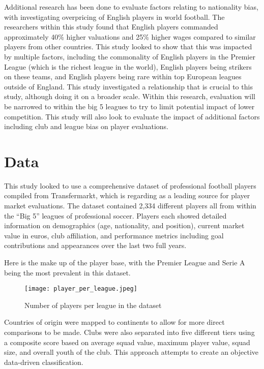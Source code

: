 \documentclass[12pt,a4paper]{article}
\begin{document}
Additional research has been done to evaluate factors relating to nationality bias, with \cite{Bell2023} investigating overpricing of English players in world football. The researchers within this study found that English players commanded approximately 40\% higher valuations and 25\% higher wages compared to similar players from other countries. This study looked to show that this was impacted by multiple factors, including the commonality of English players in the Premier League (which is the richest league in the world), English players being strikers on these teams, and English players being rare within top European leagues outside of England. This study investigated a relationship that is crucial to this study, although doing it on a broader scale. Within this research, evaluation will be narrowed to within the big 5 leagues to try to limit potential impact of lower competition. This study will also look to evaluate the impact of additional factors including club and league bias on player evaluations. 

\section{Data}
\label{sec:Data}
This study looked to use a comprehensive dataset of professional football players compiled from Transfermarkt, which is regarding as a leading source for player market evaluations. The dataset contained 2,334 different players all from within the “Big 5” leagues of professional soccer. Players each showed detailed information on demographics (age, nationality, and position), current market value in euros, club affiliation, and performance metrics including goal contributions and appearances over the last two full years.

Here is the make up of the player base, with the Premier League and Serie A being the most prevalent in this dataset. 

\begin{figure}[htbp]
    \centering
    \texttt{[image: player\_per\_league.jpeg]}
    \caption{Number of players per league in the dataset}
    \label{fig:league_plot}
\end{figure}

Countries of origin were mapped to continents to allow for more direct comparisons to be made. Clubs were also separated into five different tiers using a composite score based on average squad value, maximum player value, squad size, and overall youth of the club. This approach attempts to create an objective data-driven classification. 
\end{document}
